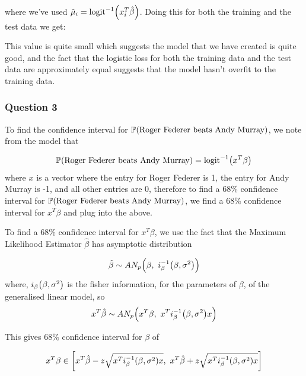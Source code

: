 \documentclass[11pt]{article} %
\let\originalleft\left
\let\originalright\right
\renewcommand{\left}{\mathopen{}\mathclose\bgroup\originalleft}
\renewcommand{\right}{\aftergroup\egroup\originalright}
\newcommand{\logit}{\text{logit}}
\begin{document}
where we've used $\hat{\mu}_i=\logit^{-1}\left(x_i^T\hat{\beta}\right)$. Doing this for both the training and the test data we get:


This value is quite small which suggests the model that we have created is quite good, and the fact that the logistic loss for both the training data and the test data are approximately equal suggests that the model hasn't overfit to the training data.

\subsubsection*{Question 3}

To find the confidence interval for $\mathbb{P}\left(\text{Roger Federer beats Andy Murray}\right)$, we note from the model that

\begin{equation*}
	\mathbb{P}\left(\text{Roger Federer beats Andy Murray}\right) = \logit^{-1}\left(x^T\beta\right)
\end{equation*}
where $x$ is a vector where the entry for Roger Federer is 1, the entry for Andy Murray is -1, and all other entries are 0, therefore to find a 68\% confidence interval for $\mathbb{P}\left(\text{Roger Federer beats Andy Murray}\right)$, we find a 68\% confidence interval for $x^T\beta$ and plug into the above.

To find a 68\% confidence interval for $x^T\beta$, we use the fact that the Maximum Likelihood Estimator $\hat{\beta}$ has asymptotic distribution

\begin{equation*}
	\hat{\beta} \sim AN_p\left(\beta,\ i^{-1}_\beta\left(\beta, \sigma^2\right)\right)
\end{equation*}
where, $i_\beta\left(\beta,\sigma^2\right)$ is the fisher information, for the parameters of $\beta$, of the generalised linear model, so 
\begin{equation*}
	x^T\hat{\beta} \sim AN_p\left(x^T\beta,\ x^Ti^{-1}_\beta\left(\beta, \sigma^2\right)x\right)
\end{equation*}

This gives 68\% confidence interval for $\beta$ of

\begin{equation}
	x^T\beta \in \left[x^T\hat{\beta} - z\sqrt{x^Ti^{-1}_\beta\left(\beta, \sigma^2\right)x},\ x^T\hat{\beta} + z\sqrt{x^Ti^{-1}_\beta\left(\beta, \sigma^2\right)x}  \right]
	\label{eqn:conf_int}
\end{equation}
\end{document}

